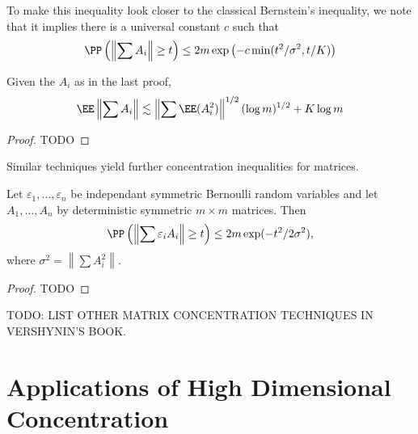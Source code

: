 \begin{remark}
    To make this inequality look closer to the classical Bernstein's inequality, we note that it implies there is a universal constant $c$ such that
    \[ \PP \left( \left\| \sum A_i \right\| \geq t \right) \leq 2m \exp \left( -c \min(t^2/\sigma^2, t/K) \right) \]
\end{remark}

\begin{corollary}
    Given the $A_i$ as in the last proof,
    \[ \EE \left\| \sum A_i \right\| \lesssim \left\| \sum \EE(A_i^2) \right\|^{1/2} (\log m)^{1/2} + K \log m \]
\end{corollary}
\begin{proof}
    TODO
\end{proof}

Similar techniques yield further concentration inequalities for matrices.

\begin{theorem}[Hoeffding]
    Let $\varepsilon_1, \dots, \varepsilon_n$ be independant symmetric Bernoulli random variables and let $A_1, \dots, A_n$ by deterministic symmetric $m \times m$ matrices. Then
    \[ \PP \left( \left\| \sum \varepsilon_i A_i \right\| \geq t \right) \leq 2m \exp(-t^2/2\sigma^2), \]
    where $\sigma^2 = \left\| \sum A_i^2 \right\|$.
\end{theorem}
\begin{proof}
    TODO
\end{proof}

TODO: LIST OTHER MATRIX CONCENTRATION TECHNIQUES IN VERSHYNIN'S BOOK.







\chapter{Applications of High Dimensional Concentration}

